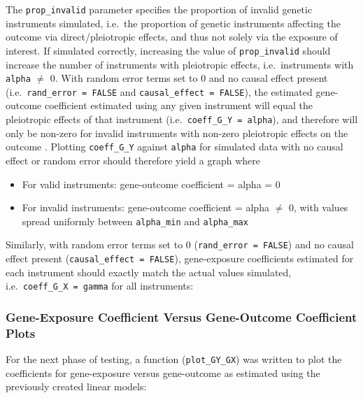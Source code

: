 \documentclass[
]{article}
\providecommand{\tightlist}{%
  \setlength{\itemsep}{0pt}\setlength{\parskip}{0pt}}
\begin{document}
\leavevmode\newline The \texttt{prop\_invalid} parameter specifies the proportion of invalid genetic instruments simulated, i.e.~the proportion of genetic instruments affecting the outcome via direct/pleiotropic effects, and thus not solely via the exposure of interest. If simulated correctly, increasing the value of \texttt{prop\_invalid} should increase the number of instruments with pleiotropic effects, i.e.~instruments with \texttt{alpha} \(\ne\) 0. With random error terms set to 0 and no causal effect present (i.e.~\texttt{rand\_error\ =\ FALSE} and \texttt{causal\_effect\ =\ FALSE}), the estimated gene-outcome coefficient estimated using any given instrument will equal the pleiotropic effects of that instrument (i.e.~\texttt{coeff\_G\_Y\ =\ alpha}), and therefore will only be non-zero for invalid instruments with non-zero pleiotropic effects on the outcome . Plotting \texttt{coeff\_G\_Y} against \texttt{alpha} for simulated data with no causal effect or random error should therefore yield a graph where

\begin{itemize}
\tightlist
\item
  For valid instruments: gene-outcome coefficient = alpha = 0
\item
  For invalid instruments: gene-outcome coefficient = alpha \(\ne\) 0, with values spread uniformly between \texttt{alpha\_min} and \texttt{alpha\_max}
\end{itemize}

\newpage

Similarly, with random error terms set to 0 (\texttt{rand\_error\ =\ FALSE}) and no causal effect present (\texttt{causal\_effect\ =\ FALSE}), gene-exposure coefficients estimated for each instrument should exactly match the actual values simulated, i.e.~\texttt{coeff\_G\_X\ =\ gamma} for all instruments:

\newpage

\subsubsection{Gene-Exposure Coefficient Versus Gene-Outcome Coefficient Plots}\label{gene-exposure-coefficient-versus-gene-outcome-coefficient-plots}

\leavevmode\newline For the next phase of testing, a function (\texttt{plot\_GY\_GX}) was written to plot the coefficients for gene-exposure versus gene-outcome as estimated using the previously created linear models:
\end{document}
